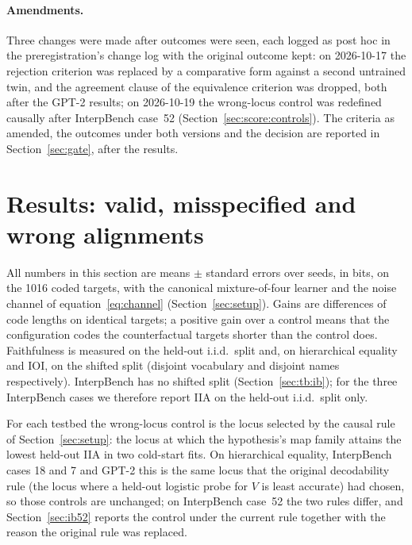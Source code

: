 \documentclass[11pt,a4paper]{article}
\begin{document}
\paragraph{Amendments.} Three changes were made after outcomes were seen, each logged as post hoc in the preregistration's change log with the original outcome kept: on 2026-10-17 the rejection criterion was replaced by a comparative form against a second untrained twin, and the agreement clause of the equivalence criterion was dropped, both after the GPT-2 results; on 2026-10-19 the wrong-locus control was redefined causally after InterpBench case~52 (Section~\ref{sec:score:controls}). The criteria as amended, the outcomes under both versions and the decision are reported in Section~\ref{sec:gate}, after the results.


\section{Results: valid, misspecified and wrong alignments}
\label{sec:results}

All numbers in this section are means $\pm$ standard errors over seeds, in bits, on the 1016 coded targets, with the canonical mixture-of-four learner and the noise channel of equation~\eqref{eq:channel} (Section~\ref{sec:setup}). Gains are differences of code lengths on identical targets; a positive gain over a control means that the configuration codes the counterfactual targets shorter than the control does. Faithfulness is measured on the held-out i.i.d.\ split and, on hierarchical equality and IOI, on the shifted split (disjoint vocabulary and disjoint names respectively). InterpBench has no shifted split (Section~\ref{sec:tb:ib}); for the three InterpBench cases we therefore report IIA on the held-out i.i.d.\ split only.

For each testbed the wrong-locus control is the locus selected by the causal rule of Section~\ref{sec:setup}: the locus at which the hypothesis's map family attains the lowest held-out IIA in two cold-start fits. On hierarchical equality, InterpBench cases 18 and 7 and GPT-2 this is the same locus that the original decodability rule (the locus where a held-out logistic probe for $V$ is least accurate) had chosen, so those controls are unchanged; on InterpBench case~52 the two rules differ, and Section~\ref{sec:ib52} reports the control under the current rule together with the reason the original rule was replaced.
\end{document}
